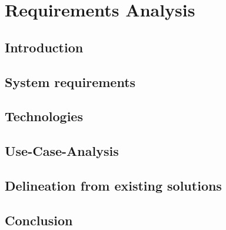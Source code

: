 \chapter{Requirements Analysis}

\section{Introduction}

\section{System requirements}

\section{Technologies}

\section{Use-Case-Analysis}

\section{Delineation from existing solutions}

\section{Conclusion}
